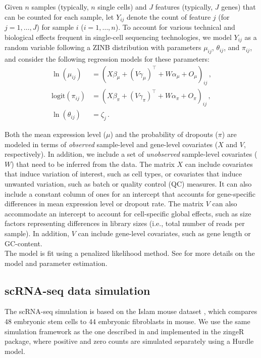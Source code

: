 \documentclass{article}
\begin{document}
Given \(n\) samples (typically, \(n\) single cells) and \(J\) features
(typically, \(J\) genes) that can be counted for each sample, let
\(Y_{ij}\) denote the count of feature \(j\) (for \(j=1,\ldots,J\)) for
sample \(i\) (\(i=1,\ldots,n\)). To account for various technical and
biological effects frequent in single-cell sequencing
technologies, we model \(Y_{ij}\) as a random variable following a ZINB
distribution with parameters \(\mu_{ij}\), \(\theta_{ij}\), and
\(\pi_{ij}\), and consider the following regression models for these parameters:
\begin{align}
\label{eq:model1}
\ln(\mu_{ij}) &= \left( X\beta_\mu + (V\gamma_\mu)^\top + W\alpha_\mu + O_\mu\right)_{ij}\,,\\
\label{eq:model2}
\text{logit}(\pi_{ij}) &= \left(X\beta_\pi + (V\gamma_\pi)^\top + W\alpha_\pi + O_\pi\right)_{ij} \,, \\
\label{eq:model3}
\ln(\theta_{ij}) &= \zeta_j \,.
\end{align}

Both the mean expression level ($\mu$) and the probability of dropouts ($\pi$) are modeled in terms of \textit{observed} sample-level and gene-level covariates ($X$ and $V$, respectively). In addition, we include a set of \textit{unobserved} sample-level covariates ($W$) that need to be inferred from the data. The matrix $X$ can include covariates that induce variation of interest, such as cell types, or covariates that induce unwanted variation, such as batch or quality control (QC) measures. It can also include a constant column of ones for an intercept that accounts for gene-specific differences in mean expression level or dropout rate. The matrix $V$ can also accommodate an intercept to account for cell-specific global effects, such as size factors representing differences in library sizes (i.e., total number of reads per sample). In addition, $V$ can include gene-level covariates, such as gene length or GC-content.\\ 

The model is fit using a penalized likelihood method. See \cite{Risso2017} for more details on the model and parameter estimation.

\subsection*{scRNA-seq data simulation}

The scRNA-seq simulation is based on the Islam mouse dataset \cite{Islam2011CharacterizationRNA-seq}, which compares 48 embryonic stem cells to 44 embryonic fibroblasts in mouse. We use the same simulation framework as the one described in \cite{VandenBerge2017ZingeR:Applications} and implemented in the zingeR package, where positive and zero counts are simulated separately using a Hurdle model.\\ 
\end{document}
